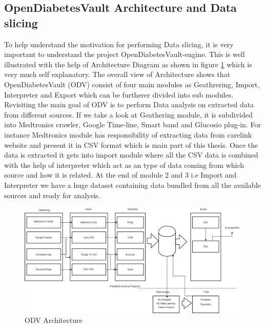 \documentclass[article,type=msc,colorback,accentcolor=tud9c,twoside,11pt]{tudthesis}
\begin{document}
	\subsection{OpenDiabetesVault Architecture and Data slicing}
	\label{subsec:OpenDiabetesVaultArchitecture}
	To help understand the motivation for performing Data slicing, it is very important to understand the project OpenDiabetesVault-engine. This is well illustrated with the help of Architecture Diagram as shown in figure \ref{fig:ODVArchitecture} which is very much self explanatory. The overall view of Architecture shows that OpenDiabetesVault (ODV) consist of four main modules as Geathrering, Import, Interpreter and Export which can be furtherer divided into sub modules. Revisiting the main goal of ODV is to perform Data analysis on extracted data from different sources. If we take a look at Geathering module, it is subdivided into Medtronics crawler, Google Time-line, Smart band and Glucosio plug-in. For instance Medtronics module has responsibility of extracting data from carelink website and present it in CSV format which is main part of this thesis. Once the data is extracted it gets into import module where all the CSV data is combined with the help of interpreter which act as an type of data coming from which source and how it is related. At the end of module 2 and 3 i.e Import and Interpreter we have a huge dataset containing data bundled from all the available sources and ready for analysis.
	\begin{figure}[h]
		\centering
		\includegraphics[scale=0.4]{ODVArchitecture.jpg}
		\caption{ODV Architecture}
		\label{fig:ODVArchitecture}
	\end{figure}
	
\end{document}
